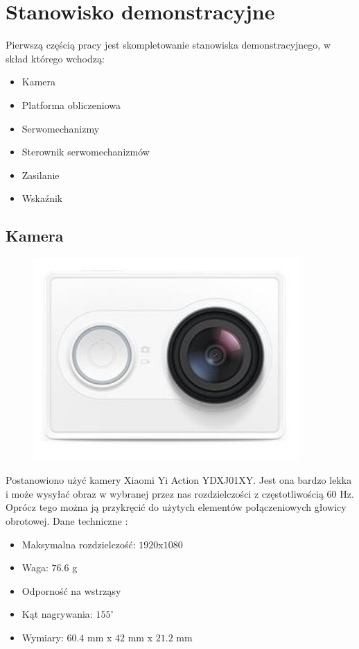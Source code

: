 \chapter{Stanowisko demonstracyjne}
\label{cha:stanowiskodemonstracyjne}

Pierwszą częścią pracy jest skompletowanie stanowiska demonstracyjnego, w skład którego wchodzą:
\begin{itemize}
	\item Kamera
	\item Platforma obliczeniowa
	\item Serwomechanizmy
	\item Sterownik serwomechanizmów
	\item Zasilanie
	\item Wskaźnik
\end{itemize}

\section{Kamera}
\label{sec:kamera}

\begin{figure}[H]
	\centering
	\includegraphics[width=4in]{Yi_action.jpg}
\end{figure}

Postanowiono użyć kamery Xiaomi Yi Action YDXJ01XY. Jest ona bardzo lekka i może wysyłać obraz w wybranej przez nas rozdzielczości z częstotliwością 60 Hz. Oprócz tego można ją przykręcić do użytych elementów połączeniowych głowicy obrotowej. Dane techniczne \cite{Xiaomi}:
\begin{itemize}
\item Maksymalna rozdzielczość: \(1920\)x\(1080\)
\item Waga: \(76.6\) g
\item Odporność na wstrząsy
\item Kąt nagrywania: \(155^\circ\)
\item Wymiary: \(60.4\) mm x \(42\) mm x \(21.2\) mm
\end{itemize}

